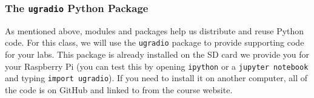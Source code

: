 \documentclass[11pt,preprint]{aastex}
\begin{document}
%
%
%
%
%
\subsubsection{The {\tt ugradio} Python Package}

\noindent
As mentioned above, modules and packages help us distribute and reuse 
Python code.
For this class, we will use
the {\tt ugradio} package to provide supporting code for your labs.
This package is already installed on the SD card we provide you for
your Raspberry Pi (you can test this by opening {\tt ipython} or
a {\tt jupyter notebook}
and typing {\tt import ugradio}). If you need to install it on 
another computer, all of the code is on GitHub and linked to from the 
course website.  
\end{document}
